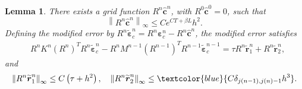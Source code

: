 \documentclass[11pt,reqno]{amsart}
\theoremstyle{plain}
\newtheorem{lemma}[theorem]{Lemma}
\theoremstyle{definition}
\numberwithin{equation}{section}
\newcommand{\paren}[1]{\left(#1\right)}
\newcommand{\wh}[1]{\widehat{#1}}
\newcommand{\wt}[1]{\widetilde{#1}}
\newcommand{\bm}[1]{\boldsymbol{#1}}
\newcommand{\norm}[1]{\left\lVert #1 \right\rVert}
\begin{document}
\begin{lemma}\label{lem:mod-LTE}
There exists a grid function $R^n\wh{\bm c}^n$, with
$R^0\wh{\bm c}^0=0$, such that
\begin{equation}
    \norm{R^n\wh{\bm c}^n}_\infty
    \le Ce^{CT+\beta L}h^2 .
\end{equation}
Defining the modified error by
$R^n\wt{\bm\varepsilon}_c^n=R^n\bm\varepsilon_c^n-R^n\wh{\bm c}^n$, the modified error satisfies
\begin{align}
    & R^n K^n (R^n)^T R^n \wt{\bm\varepsilon}_c^n - R^n M^{n-1}  (R^{n-1})^T R^{n-1} \wt{\bm\varepsilon}_c^{n-1} = \tau R^n\wt{\bm r}_1^n + R^n\wt{\bm r}_2^n,
\end{align}
and
\begin{align}\label{eqn:wt_LTE_bound}
    \norm{R^n\wt{\bm r}_1^n}_\infty \le C\paren{\tau +h^2},\quad
    \norm{R^n\wt{\bm r}_2^n}_\infty
    \le \textcolor{blue}{C\delta_{j(n-1),j(n)-1}h^3}.
\end{align}
\end{lemma}
\end{document}
